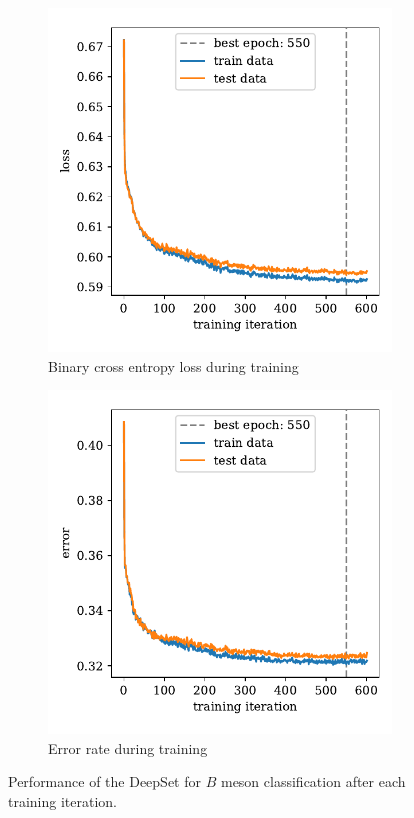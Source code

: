 \begin{figure}
    \centering
    \begin{subfigure}{0.5\textwidth}
        \centering
        \includegraphics[width=\textwidth]{images/B_history_loss.pdf}
        \caption{Binary cross entropy loss during training}
    \end{subfigure}%
    \begin{subfigure}{0.5\textwidth}
        \centering
        \includegraphics[width=\textwidth]{images/B_history_error.pdf}
        \caption{Error rate during training}
    \end{subfigure}%
    \caption{Performance of the DeepSet for $B$ meson classification after each training iteration.}
    \label{fig:B_history}
\end{figure}

